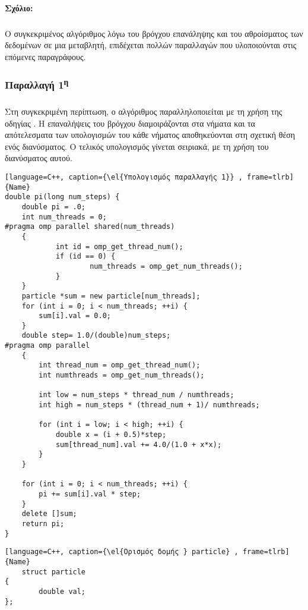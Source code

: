 \paragraph{Σχόλιο:}
\subparagraph{}
Ο συγκεκριμένος αλγόριθμος λόγω του βρόγχου επανάληψης και του αθροίσματος των δεδομένων σε μια μεταβλητή, επιδέχεται πολλών παραλλαγών που υλοποιούνται στις επόμενες παραγράφους.


\clearpage
\subsubsection{Παραλλαγή 1\textsuperscript{η}}
\subparagraph{}
Στη συγκεκριμένη περίπτωση, ο αλγόριθμος παραλληλοποιείται με τη χρήση της οδηγίας \emph{}. Η επαναλήψεις του βρόγχου διαμοιράζονται στα νήματα και τα απότελεσματα των υπολογισμών του κάθε νήματος αποθηκεύονται στη σχετική θέση ενός διανύσματος. Ο τελικός υπολογισμός γίνεται σειριακά, με τη χρήση του διανύσματος αυτού.
\begin{lstlisting}[language=C++, caption={\el{Υπολογισμός παραλλαγής 1}} , frame=tlrb]{Name}
double pi(long num_steps) {
    double pi = .0;
    int num_threads = 0;
#pragma omp parallel shared(num_threads)
    {
            int id = omp_get_thread_num();
            if (id == 0) {
                    num_threads = omp_get_num_threads();
            }
    }
    particle *sum = new particle[num_threads];
    for (int i = 0; i < num_threads; ++i) {
        sum[i].val = 0.0;
    }
    double step= 1.0/(double)num_steps;
#pragma omp parallel 
    {
        int thread_num = omp_get_thread_num();
        int numthreads = omp_get_num_threads();

        int low = num_steps * thread_num / numthreads;
        int high = num_steps * (thread_num + 1)/ numthreads;

        for (int i = low; i < high; ++i) {
            double x = (i + 0.5)*step;
            sum[thread_num].val += 4.0/(1.0 + x*x);
        }
    }

    for (int i = 0; i < num_threads; ++i) {
        pi += sum[i].val * step;
    }
    delete []sum;
    return pi;
}

\end{lstlisting}


\clearpage
{}
\begin{lstlisting}[language=C++, caption={\el{Ορισμός δομής } particle} , frame=tlrb]{Name}
	struct particle
{
        double val;
};

\end{lstlisting}

